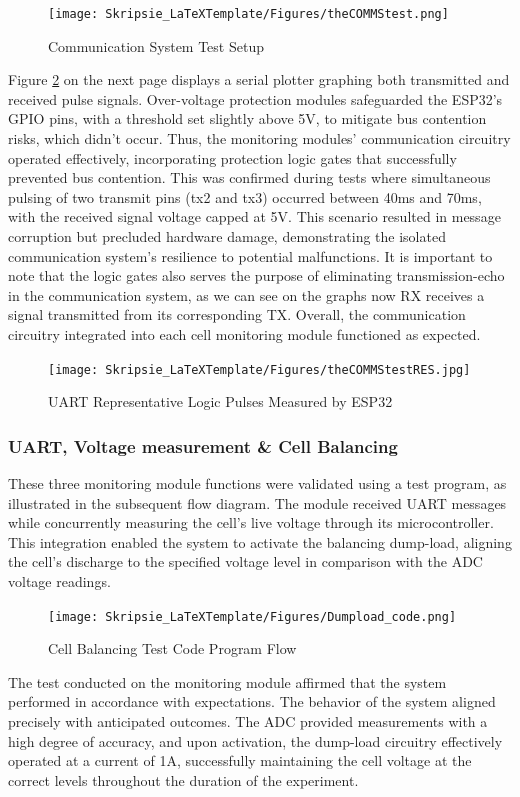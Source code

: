 \begin{figure}[h!]
\centering
\texttt{[image: Skripsie\_LaTeXTemplate/Figures/theCOMMStest.png]}
\caption{Communication System Test Setup}
\label{fig:comsEXP1}
\end{figure}
\noindent
Figure \ref{fig:comsEXP2} on the next page displays a serial plotter graphing both transmitted and received pulse signals. Over-voltage protection modules safeguarded the ESP32's GPIO pins, with a threshold set slightly above 5V, to mitigate bus contention risks, which didn't occur. Thus, the monitoring modules' communication circuitry operated effectively, incorporating protection logic gates that successfully prevented bus contention. This was confirmed during tests where simultaneous pulsing of two transmit pins (tx2 and tx3) occurred between 40ms and 70ms, with the received signal voltage capped at 5V. This scenario resulted in message corruption but precluded hardware damage, demonstrating the isolated communication system's resilience to potential malfunctions.\newline\newline
\noindent
It is important to note that the logic gates also serves the purpose of eliminating transmission-echo in the communication system, as we can see on the graphs now RX receives a signal transmitted from its corresponding TX. Overall, the communication circuitry integrated into each cell monitoring module functioned as expected.
\newpage
\begin{figure}[h!]
\centering
\texttt{[image: Skripsie\_LaTeXTemplate/Figures/theCOMMStestRES.jpg]}
\caption{UART Representative Logic Pulses Measured by ESP32}
\label{fig:comsEXP2}
\end{figure}
\subsubsection{UART, Voltage measurement \& Cell Balancing}\label{subsec:CBT}
These three monitoring module functions were validated using a test program, as illustrated in the subsequent flow diagram. The module received UART messages while concurrently measuring the cell's live voltage through its microcontroller. This integration enabled the system to activate the balancing dump-load, aligning the cell's discharge to the specified voltage level in comparison with the ADC voltage readings.

\begin{figure}[h!]
\centering
\texttt{[image: Skripsie\_LaTeXTemplate/Figures/Dumpload\_code.png]}
\caption{Cell Balancing Test Code Program Flow}
\label{fig:DL_EXP}
\end{figure}
\noindent
The test conducted on the monitoring module affirmed that the system performed in accordance with expectations. The behavior of the system aligned precisely with anticipated outcomes. The ADC provided measurements with a high degree of accuracy, and upon activation, the dump-load circuitry effectively operated at a current of 1A, successfully maintaining the cell voltage at the correct levels throughout the duration of the experiment.\newpage
